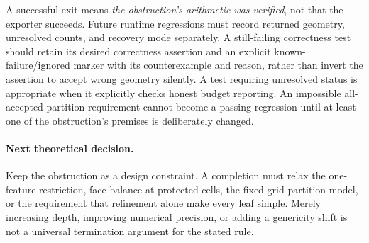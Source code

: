 \documentclass[11pt]{article}
\begin{document}
A successful exit means \emph{the obstruction's arithmetic was
verified}, not that the exporter succeeds. Future runtime regressions
must record returned geometry, unresolved counts, and recovery mode
separately. A still-failing correctness test should retain its desired
correctness assertion and an explicit known-failure/ignored marker
with its counterexample and reason, rather than invert the assertion
to accept wrong geometry silently. A test requiring unresolved status
is appropriate when it explicitly checks honest budget reporting.
An impossible all-accepted-partition requirement cannot become a
passing regression until at least one of the obstruction's premises
is deliberately changed.

\paragraph{Next theoretical decision.}
Keep the obstruction as a design constraint. A completion must relax
the one-feature restriction, face balance at protected cells, the
fixed-grid partition model, or the requirement that refinement alone
make every leaf simple. Merely increasing depth, improving numerical
precision, or adding a genericity shift is not a universal termination
argument for the stated rule.
\end{document}
